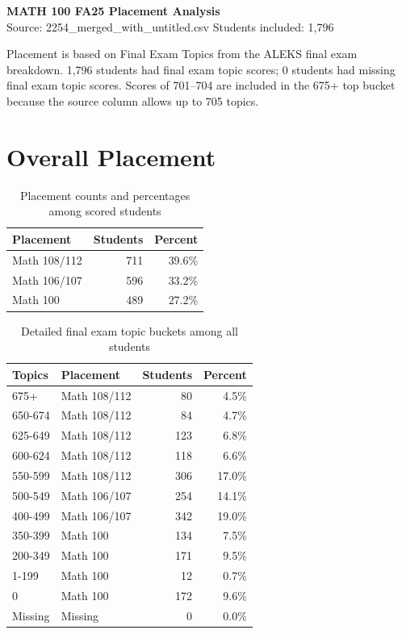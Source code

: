 \documentclass[11pt]{article}
\begin{document}
\begin{center}
{\Large\bfseries MATH 100 FA25 Placement Analysis}\\[4pt]
{\normalsize Source: 2254\_merged\_with\_untitled.csv \quad Students included: 1,796}
\end{center}

Placement is based on Final Exam Topics from the ALEKS final exam breakdown. 1,796 students had final exam topic scores; 0 students had missing final exam topic scores. Scores of 701--704 are included in the 675+ top bucket because the source column allows up to 705 topics.

\section*{Overall Placement}

\begin{table}[htbp]
\centering
\small
\caption{Placement counts and percentages among scored students}
\begin{tabular}{lrr}
\hline
Placement & Students & Percent \\
\hline
Math 108/112 & 711 & 39.6\% \\
Math 106/107 & 596 & 33.2\% \\
Math 100 & 489 & 27.2\% \\
\hline
\end{tabular}
\end{table}

\begin{table}[htbp]
\centering
\small
\caption{Detailed final exam topic buckets among all students}
\begin{tabular}{llrr}
\hline
Topics & Placement & Students & Percent \\
\hline
675+ & Math 108/112 & 80 & 4.5\% \\
650-674 & Math 108/112 & 84 & 4.7\% \\
625-649 & Math 108/112 & 123 & 6.8\% \\
600-624 & Math 108/112 & 118 & 6.6\% \\
550-599 & Math 108/112 & 306 & 17.0\% \\
500-549 & Math 106/107 & 254 & 14.1\% \\
400-499 & Math 106/107 & 342 & 19.0\% \\
350-399 & Math 100 & 134 & 7.5\% \\
200-349 & Math 100 & 171 & 9.5\% \\
1-199 & Math 100 & 12 & 0.7\% \\
0 & Math 100 & 172 & 9.6\% \\
Missing & Missing & 0 & 0.0\% \\
\hline
\end{tabular}
\end{table}
\end{document}
